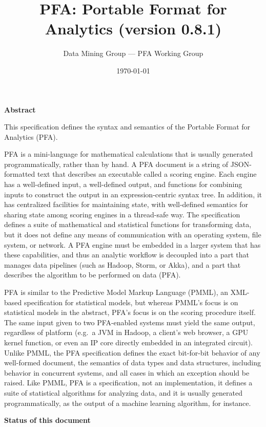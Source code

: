 \documentclass{article}
\title{PFA: Portable Format for Analytics (version 0.8.1)}
\author{Data Mining Group --- PFA Working Group}
\date{\today}
\theoremstyle{definition}
\begin{document}
\maketitle

{\large \bf Abstract}
\vspace{0.25 cm}

This specification defines the syntax and semantics of the Portable Format for Analytics (PFA).

PFA is a mini-language for mathematical calculations that is usually generated programmatically, rather than by hand.  A PFA document is a string of JSON-formatted text that describes an executable called a scoring engine.  Each engine has a well-defined input, a well-defined output, and functions for combining inputs to construct the output in an expression-centric syntax tree.  In addition, it has centralized facilities for maintaining state, with well-defined semantics for sharing state among scoring engines in a thread-safe way.  The specification defines a suite of mathematical and statistical functions for transforming data, but it does not define any means of communication with an operating system, file system, or network.  A PFA engine must be embedded in a larger system that has these capabilities, and thus an analytic workflow is decoupled into a part that manages data pipelines (such as Hadoop, Storm, or Akka), and a part that describes the algorithm to be performed on data (PFA).  

PFA is similar to the Predictive Model Markup Language (PMML), an XML-based specification for statistical models, but whereas PMML's focus is on statistical models in the abstract, PFA's focus is on the scoring procedure itself.  The same input given to two PFA-enabled systems must yield the same output, regardless of platform (e.g.\ a JVM in Hadoop, a client's web browser, a GPU kernel function, or even an IP core directly embedded in an integrated circuit).  Unlike PMML, the PFA specification defines the exact bit-for-bit behavior of any well-formed document, the semantics of data types and data structures, including behavior in concurrent systems, and all cases in which an exception should be raised.  Like PMML, PFA is a specification, not an implementation, it defines a suite of statistical algorithms for analyzing data, and it is usually generated programmatically, as the output of a machine learning algorithm, for instance.

\vspace{0.5 cm}
{\large \bf Status of this document}
\vspace{0.25 cm}
\end{document}
